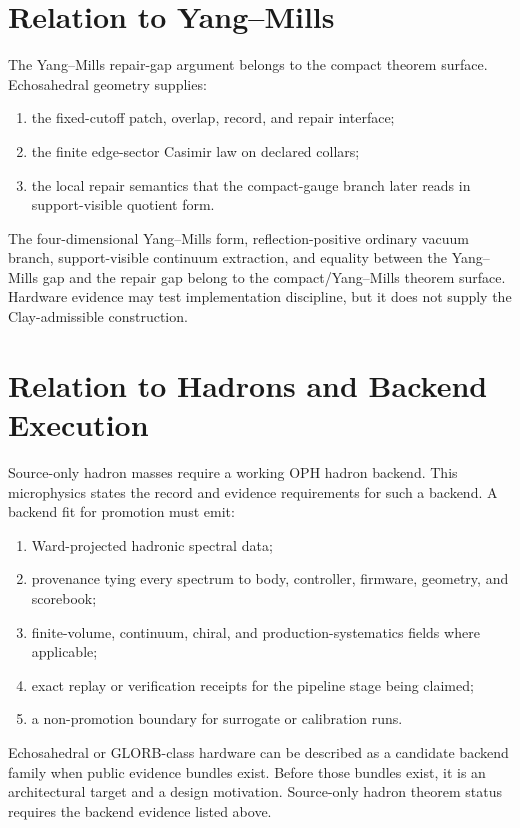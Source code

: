 \documentclass[11pt]{article}
\theoremstyle{remark}
\theoremstyle{plain}
\begin{document}
\section{Relation to Yang--Mills}

The Yang--Mills repair-gap argument belongs to the compact theorem surface. Echosahedral geometry
supplies:
\begin{enumerate}[leftmargin=2em]
\item the fixed-cutoff patch, overlap, record, and repair interface;
\item the finite edge-sector Casimir law on declared collars;
\item the local repair semantics that the compact-gauge branch later reads in support-visible
quotient form.
\end{enumerate}

The four-dimensional Yang--Mills form, reflection-positive ordinary vacuum branch, support-visible
continuum extraction, and equality between the Yang--Mills gap and the repair gap belong to the
compact/Yang--Mills theorem surface. Hardware evidence may test implementation discipline, but it
does not supply the Clay-admissible construction.

\section{Relation to Hadrons and Backend Execution}

Source-only hadron masses require a working OPH hadron backend. This microphysics states the
record and evidence requirements for such a backend. A backend fit for promotion must emit:
\begin{enumerate}[leftmargin=2em]
\item Ward-projected hadronic spectral data;
\item provenance tying every spectrum to body, controller, firmware, geometry, and scorebook;
\item finite-volume, continuum, chiral, and production-systematics fields where applicable;
\item exact replay or verification receipts for the pipeline stage being claimed;
\item a non-promotion boundary for surrogate or calibration runs.
\end{enumerate}

Echosahedral or GLORB-class hardware can be described as a candidate backend family when public
evidence bundles exist. Before those bundles exist, it is an architectural target and a design
motivation. Source-only hadron theorem status requires the backend evidence listed above.
\end{document}
